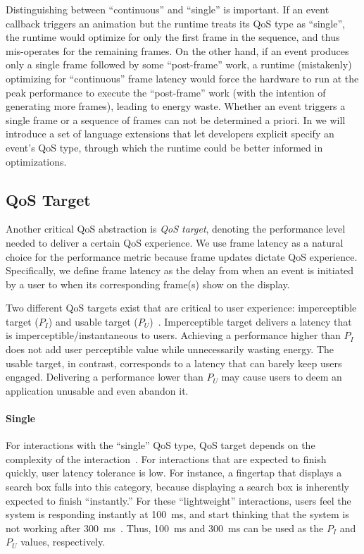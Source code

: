 Distinguishing between ``continuous'' and ``single'' is important. If an event callback triggers an animation but the runtime treats its QoS type as ``single'', the runtime would optimize for only the first frame in the sequence, and thus mis-operates for the remaining frames. On the other hand, if an event produces only a single frame followed by some ``post-frame'' work, a runtime (mistakenly) optimizing for ``continuous'' frame latency would force the hardware to run at the peak performance to execute the ``post-frame'' work (with the intention of generating more frames), leading to energy waste. Whether an event triggers a single frame or a sequence of frames can not be determined a priori. In  we will introduce a set of language extensions that let developers explicit specify an event's QoS type, through which the runtime could be better informed in optimizations.

\subsection{QoS Target}
\label{sec:lang:abst:target}

Another critical QoS abstraction is \textit{QoS target}, denoting the performance level needed to deliver a certain QoS experience. We use frame latency as a natural choice for the performance metric because frame updates dictate QoS experience. Specifically, we define frame latency as the delay from when an event is initiated by a user to when its corresponding frame(s) show on the display.

Two different QoS targets exist that are critical to user experience: imperceptible target ($P_I$) and usable target ($P_U$)~\cite{ebs}. Imperceptible target delivers a latency that is imperceptible/instantaneous to users. Achieving a performance higher than $P_I$ does not add user perceptible value while unnecessarily wasting energy. The usable target, in contrast, corresponds to a latency that can barely keep users engaged. Delivering a performance lower than $P_U$ may cause users to deem an application unusable and even abandon it.

\paragraph{Single} For interactions with the ``single'' QoS type, QoS target depends on the complexity of the interaction~\cite{eventlatency}. For interactions that are expected to finish quickly, user latency tolerance is low. For instance, a fingertap that displays a search box falls into this category, because displaying a search box is inherently expected to finish ``instantly.'' For these ``lightweight'' interactions, users feel the system is responding instantly at 100~ms, and start thinking that the system is not working after 300~ms~\cite{humanperception}. Thus, 100~ms and 300~ms can be used as the $P_I$ and $P_U$ values, respectively.

